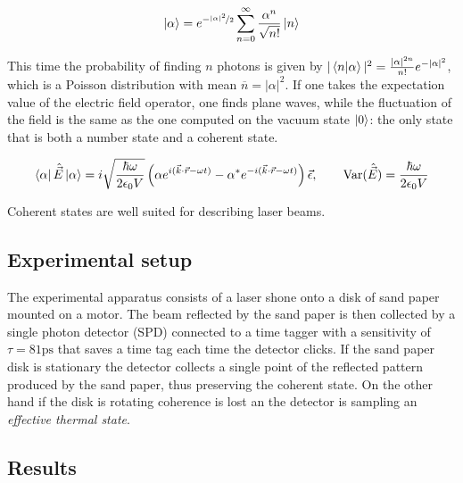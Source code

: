 \documentclass[a4paper, 11pt]{article}
\begin{document}
      \begin{equation*}
        \ket{\alpha} = e^{-\frac[f]{|\alpha|^2}{2}} \sum_{n = 0}^\infty \frac{\alpha^n}{\sqrt{n!}} \ket{n}
      \end{equation*}

      This time the probability of finding $n$ photons is given by $|\bra{n}\ket{\alpha}|^2 = \frac{|\alpha|^{2n}}{n!} e^{-|\alpha|^2}$, which is a Poisson distribution with mean $\overbar{n} = |\alpha|^2$. If one takes the expectation value of the electric field operator, one finds plane waves, while the fluctuation of the field is the same as the one computed on the vacuum state $\ket{0}$: the only state that is both a number state and a coherent state.

      \begin{gather*}
        \bra{\alpha}\hat{\vec{E}} \ket{\alpha} = i \sqrt{\frac{\hbar\omega}{2\epsilon_0V}} \left(\alpha e^{i(\vec{k}\cdot\vec{r} - \omega t)} - \alpha^* e^{-i(\vec{k}\cdot\vec{r} - \omega t)} \right) \vec{\epsilon}, \qquad
        \text{Var}(\hat{\vec{E}}) = \frac{\hbar\omega}{2\epsilon_0V}
      \end{gather*}

      Coherent states are well suited for describing laser beams.



  \subsection{Experimental setup}
    The experimental apparatus consists of a laser shone onto a disk of sand paper mounted on a motor. The beam reflected by the sand paper is then collected by a single photon detector (SPD) connected to a time tagger with a sensitivity of $\tau = 81 \si{\pico\second}$ that saves a time tag each time the detector clicks.
    If the sand paper disk is stationary the detector collects a single point of the reflected pattern produced by the sand paper, thus preserving the coherent state. On the other hand if the disk is rotating coherence is lost an the detector is sampling an \emph{effective thermal state}.

  \subsection{Results}
\end{document}
